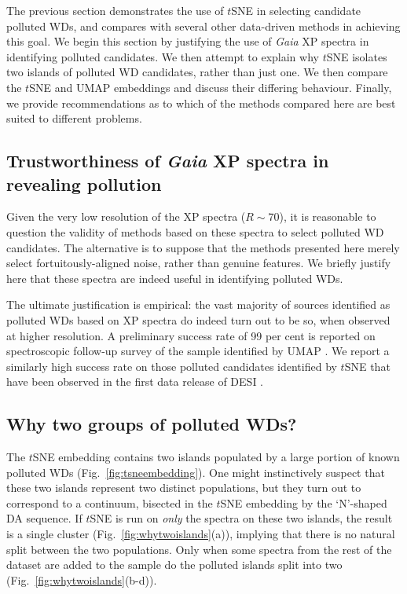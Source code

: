 \documentclass[fleqn,usenatbib]{rasti}
\begin{document}
The previous section demonstrates the use of $t$SNE in selecting candidate polluted WDs, and compares with several other data-driven methods in achieving this goal.
We begin this section by justifying the use of \textit{Gaia} XP spectra in identifying polluted candidates.
We then attempt to explain why $t$SNE isolates two islands of polluted WD candidates, rather than just one.
We then compare the $t$SNE and UMAP embeddings and discuss their differing behaviour.
Finally, we provide recommendations as to which of the methods compared here are best suited to different problems.


\subsection{Trustworthiness of \textit{Gaia} XP spectra in revealing pollution}

Given the very low resolution of the XP spectra ($R\sim 70$), it is reasonable to question the validity of methods based on these spectra to select polluted WD candidates.
The alternative is to suppose that the methods presented here merely select fortuitously-aligned noise, rather than genuine features.
We briefly justify here that these spectra are indeed useful in identifying polluted WDs.

The ultimate justification is empirical: the vast majority of sources identified as polluted WDs based on XP spectra do indeed turn out to be so, when observed at higher resolution.
A preliminary success rate of 99 per cent is reported on spectroscopic follow-up survey of the sample identified by UMAP \citep{kao24}.
We report a similarly high success rate on those polluted candidates identified by $t$SNE that have been observed in the first data release of DESI \citep{desidr1}.




\subsection{Why two groups of polluted WDs?}
\label{sec:whytwo}

The $t$SNE embedding contains two islands populated by a large portion of known polluted WDs (Fig.~\ref{fig:tsneembedding}).
One might instinctively suspect that these two islands represent two distinct populations, but they turn out to correspond to a continuum, bisected in the $t$SNE embedding by the `N'-shaped DA sequence.
If $t$SNE is run on \textit{only} the spectra on these two islands, the result is a single cluster (Fig.~\ref{fig:whytwoislands}(a)), implying that there is no natural split between the two populations.
Only when some spectra from the rest of the dataset are added to the sample do the polluted islands split into two (Fig.~\ref{fig:whytwoislands}(b-d)).
\end{document}
